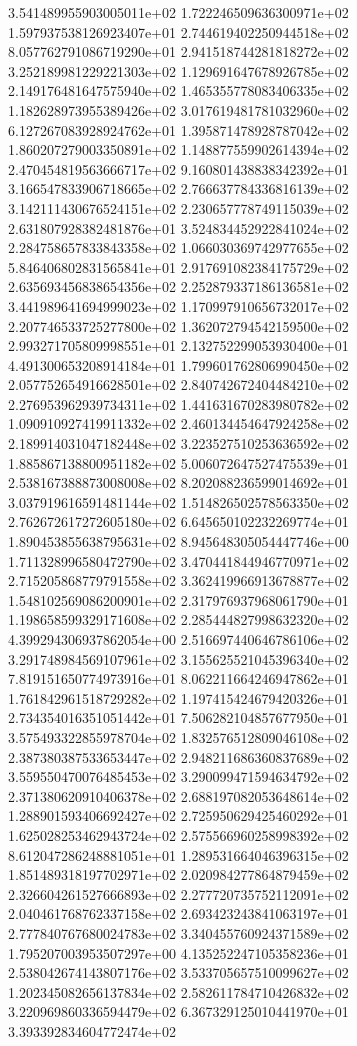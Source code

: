 3.541489955903005011e+02 1.722246509636300971e+02 1.597937538126923407e+01
2.744619402250944518e+02 8.057762791086719290e+01 2.941518744281818272e+02
3.252189981229221303e+02 1.129691647678926785e+02 2.149176481647575940e+02
1.465355778083406335e+02 1.182628973955389426e+02 3.017619481781032960e+02
6.127267083928924762e+01 1.395871478928787042e+02 1.860207279003350891e+02
1.148877559902614394e+02 2.470454819563666717e+02 9.160801438838342392e+01
3.166547833906718665e+02 2.766637784336816139e+02 3.142111430676524151e+02
2.230657778749115039e+02 2.631807928382481876e+01 3.524834452922841024e+02
2.284758657833843358e+02 1.066030369742977655e+02 5.846406802831565841e+01
2.917691082384175729e+02 2.635693456838654356e+02 2.252879337186136581e+02
3.441989641694999023e+02 1.170997910656732017e+02 2.207746533725277800e+02
1.362072794542159500e+02 2.993271705809998551e+01 2.132752299053930400e+01
4.491300653208914184e+01 1.799601762806990450e+02 2.057752654916628501e+02
2.840742672404484210e+02 2.276953962939734311e+02 1.441631670283980782e+02
1.090910927419911332e+02 2.460134454647924258e+02 2.189914031047182448e+02
3.223527510253636592e+02 1.885867138800951182e+02 5.006072647527475539e+01
2.538167388873008008e+02 8.202088236599014692e+01 3.037919616591481144e+02
1.514826502578563350e+02 2.762672617272605180e+02 6.645650102232269774e+01
1.890453855638795631e+02 8.945648305054447746e+00 1.711328996580472790e+02
3.470441844946770971e+02 2.715205868779791558e+02 3.362419966913678877e+02
1.548102569086200901e+02 2.317976937968061790e+01 1.198658599329171608e+02
2.285444827998632320e+02 4.399294306937862054e+00 2.516697440646786106e+02
3.291748984569107961e+02 3.155625521045396340e+02 7.819151650774973916e+01
8.062211664246947862e+01 1.761842961518729282e+02 1.197415424679420326e+01
2.734354016351051442e+01 7.506282104857677950e+01 3.575493322855978704e+02
1.832576512809046108e+02 2.387380387533653447e+02 2.948211686360837689e+02
3.559550470076485453e+02 3.290099471594634792e+02 2.371380620910406378e+02
2.688197082053648614e+02 1.288901593406692427e+02 2.725950629425460292e+01
1.625028253462943724e+02 2.575566960258998392e+02 8.612047286248881051e+01
1.289531664046396315e+02 1.851489318197702971e+02 2.020984277864879459e+02
2.326604261527666893e+02 2.277720735752112091e+02 2.040461768762337158e+02
2.693423243841063197e+01 2.777840767680024783e+02 3.340455760924371589e+02
1.795207003953507297e+00 4.135252247105358236e+01 2.538042674143807176e+02
3.533705657510099627e+02 1.202345082656137834e+02 2.582611784710426832e+02
3.220969860336594479e+02 6.367329125010441970e+01 3.393392834604772474e+02
